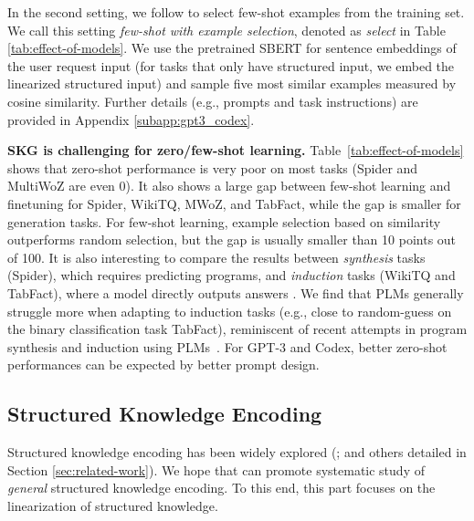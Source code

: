 \documentclass[11pt]{article}
\begin{document}
In the second setting, we follow \citet{gao2021making} to select few-shot examples from the training set. 
We call this setting \textit{few-shot with example selection}, denoted as \textit{select} in Table \ref{tab:effect-of-models}. 
We use the pretrained SBERT \cite{reimers-2020-multilingual-sentence-bert} for sentence embeddings of the user request input (for tasks that only have structured input, we embed the linearized structured input) and sample five most similar examples measured by cosine similarity. Further details (e.g., prompts and task instructions) are provided in Appendix \ref{subapp:gpt3_codex}.

\noindent\textbf{SKG is challenging for zero/few-shot learning. }
Table~\ref{tab:effect-of-models} shows that zero-shot performance is very poor on most tasks (Spider and MultiWoZ are even 0). 
It also shows a large gap between few-shot learning and finetuning for Spider, WikiTQ, MWoZ, and TabFact, while the gap is smaller for generation tasks. 
For few-shot learning, example selection based on similarity outperforms random selection, but the gap is usually smaller than 10 points out of 100. 
It is also interesting to compare the results between \textit{synthesis} tasks (Spider), which requires predicting programs, and \textit{induction} tasks (WikiTQ and TabFact), where a model directly outputs answers \citep{Devlin2017RobustFillNP}. 
We find that PLMs generally struggle more when adapting to induction tasks (e.g., close to random-guess on the binary classification task TabFact), reminiscent of recent attempts in program synthesis and induction using PLMs~\citep{Austin2021ProgramSW}.
For GPT-3 and Codex, 
better zero-shot performances can be expected by better prompt design. 

\subsection{Structured Knowledge Encoding}
\label{subsec:structured-encoding-analysis}
Structured knowledge encoding has been widely explored (\citealp{Bogin2019GlobalRO,kagnet-emnlp19,agarwal2020knowledge,saxena2020improving,yasunaga2020graph,yasunaga2022dragon}; and others detailed in Section \ref{sec:related-work}). We hope that \uskg can promote systematic study of \textit{general} structured knowledge encoding. 
To this end, this part focuses on the linearization of structured knowledge. 
\end{document}
